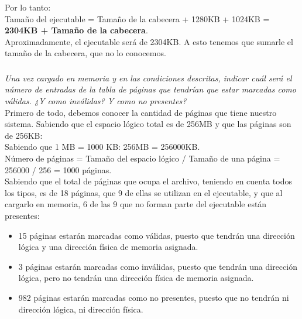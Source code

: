 \documentclass[spanish]{article}
\begin{document}
Por lo tanto:\\

Tamaño del ejecutable = Tamaño de la cabecera + 1280KB +
1024KB = \textbf{2304KB + Tamaño de la cabecera}.\\

Aproximadamente, el ejecutable será de 2304KB. A esto
tenemos que sumarle el tamaño de la cabecera, que no lo
conocemos.

\newpage

\subsubsection{}

\textit{Una vez cargado en memoria y en las condiciones
descritas, indicar cuál será el número de entradas de la
tabla de páginas que tendrían que estar marcadas como
válidas. ¿Y como inválidas? Y como no presentes?}\\

Primero de todo, debemos conocer la cantidad de páginas que
tiene nuestro sistema. Sabiendo que el espacio lógico total
es de 256MB y que las páginas son de 256KB:\\

Sabiendo que 1 MB = 1000 KB: 256MB = 256000KB.\\

Número de páginas = Tamaño del espacio lógico / Tamaño de
una página = 256000 / 256 = 1000 páginas.\\

Sabiendo que el total de páginas que ocupa el archivo,
teniendo en cuenta todos los tipos, es de 18 páginas, que 9
de ellas se utilizan en el ejecutable, y que al cargarlo en
memoria, 6 de las 9 que no forman parte del ejecutable están
presentes:

\begin{itemize}
\item 15 páginas estarán marcadas como válidas, puesto que
tendrán una dirección lógica y una dirección física de memoria asignada.
\item 3 páginas estarán marcadas como inválidas, puesto que
tendrán una dirección lógica, pero no tendrán una dirección
física de memoria asignada.
\item 982 páginas estarán marcadas como no presentes, puesto
que no tendrán ni dirección lógica, ni dirección física.
\end{itemize}

\subsubsection{}
\end{document}
